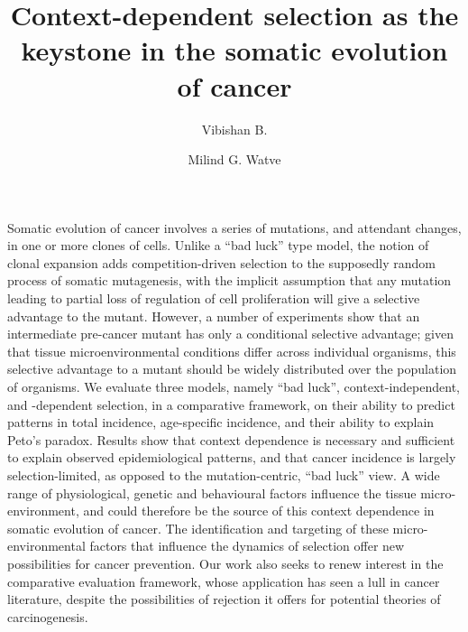 \documentclass[12pt, onecolumn, a4paper]{article}
\date{\empty}
\author[1]{Vibishan B.}
\author[1,*]{Milind G. Watve}
\affil[1]{\small Department of Biology, Indian Institute of Science Education and Research, Pune}
\affil[*]{\small Corresponding author: milind@iiserpune.ac.in}
\title{Context-dependent selection as the keystone in the somatic evolution of cancer}
\begin{document}
\maketitle

Somatic evolution of cancer involves a series of mutations, and attendant changes, in one or more clones of cells. Unlike a ``bad luck'' type model, the notion of clonal expansion adds competition-driven selection to the supposedly random process of somatic mutagenesis, with the implicit assumption that any mutation leading to partial loss of regulation of cell proliferation will give a selective advantage to the mutant. However, a number of experiments show that an intermediate pre-cancer mutant has only a conditional selective advantage; given that tissue microenvironmental conditions differ across individual organisms, this selective advantage to a mutant should be widely distributed over the population of organisms. We evaluate three models, namely ``bad luck'', context-independent, and -dependent selection, in a comparative framework, on their ability to predict patterns in total incidence, age-specific incidence, and their ability to explain Peto’s paradox. Results show that context dependence is necessary and sufficient to explain observed epidemiological patterns, and that cancer incidence is largely selection-limited, as opposed to the mutation-centric, ``bad luck'' view. A wide range of physiological, genetic and behavioural factors influence the tissue micro-environment, and could therefore be the source of this context dependence in somatic evolution of cancer. The identification and targeting of these micro-environmental factors that influence the dynamics of selection offer new possibilities for cancer prevention. Our work also seeks to renew interest in the comparative evaluation framework, whose application has seen a lull in cancer literature, despite the possibilities of rejection it offers for potential theories of carcinogenesis.
\end{document}
